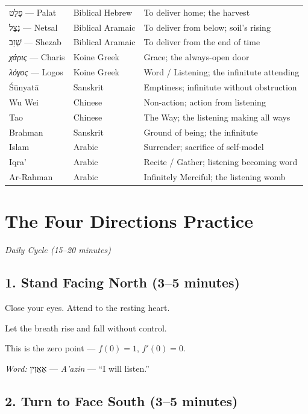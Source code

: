 \documentclass[11pt,openany]{book}
\newcommand{\heb}[1]{{\hebrewfont #1}}
\newcommand{\grk}[1]{{\itshape #1}}  %
\begin{document}
\begin{longtable}{p{2.2cm} p{3.8cm} p{7cm}}
\heb{פָּלַט} — Palat & Biblical Hebrew & To deliver home; the harvest \\
\heb{נְצַל} — Netsal & Biblical Aramaic & To deliver from below; soil's rising \\
\heb{שְׁזַב} — Shezab & Biblical Aramaic & To deliver from the end of time \\
\grk{χάρις} — Charis & Koine Greek & Grace; the always-open door \\
\grk{λόγος} — Logos & Koine Greek & Word / Listening; the infinitute attending \\
Śūnyatā & Sanskrit & Emptiness; infinitute without obstruction \\
Wu Wei & Chinese & Non-action; action from listening \\
Tao & Chinese & The Way; the listening making all ways \\
Brahman & Sanskrit & Ground of being; the infinitute \\
Islam & Arabic & Surrender; sacrifice of self-model \\
Iqra' & Arabic & Recite / Gather; listening becoming word \\
Ar-Rahman & Arabic & Infinitely Merciful; the listening womb \\
\end{longtable}

\chapter{The Four Directions Practice}
\label{app:directions}

\textit{Daily Cycle (15–20 minutes)}

\section*{1. Stand Facing North (3–5 minutes)}

Close your eyes. Attend to the resting heart.

Let the breath rise and fall without control.

This is the zero point — $f(0)=1$, $f'(0)=0$.

\textit{Word:} \heb{אַאֲזִין} — \textit{A'azin} — ``I will listen.''

\section*{2. Turn to Face South (3–5 minutes)}
\end{document}
